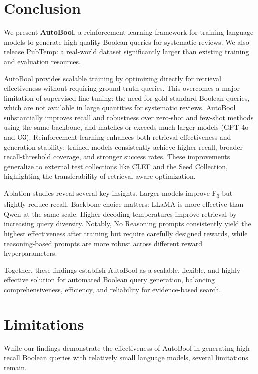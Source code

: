 \section{Conclusion}

We present \textbf{AutoBool}, a reinforcement learning framework for training language models to generate high-quality Boolean queries for systematic reviews. We also release PubTemp: a real-world dataset significantly larger than existing training and evaluation resources.

AutoBool provides scalable training by optimizing directly for retrieval effectiveness without requiring ground-truth queries. This overcomes a major limitation of supervised fine-tuning: the need for gold-standard Boolean queries, which are not available in large quantities for systematic reviews.
AutoBool substantially improves recall and robustness over zero-shot and few-shot methods using the same backbone, and matches or exceeds much larger models (GPT-4o and O3). Reinforcement learning enhances both retrieval effectiveness and generation stability: trained models consistently achieve higher recall, broader recall-threshold coverage, and stronger success rates. These improvements generalize to external test collections like CLEF and the Seed Collection, highlighting the transferability of retrieval-aware optimization.

Ablation studies reveal several key insights. Larger models improve F\textsubscript{3} but slightly reduce recall. Backbone choice matters: LLaMA is more effective than Qwen at the same scale. Higher decoding temperatures improve retrieval by increasing query diversity. Notably, No Reasoning prompts consistently yield the highest effectiveness after training but require carefully designed rewards, while reasoning-based prompts are more robust across different reward hyperparameters.

Together, these findings establish AutoBool as a scalable, flexible, and highly effective solution for automated Boolean query generation, balancing comprehensiveness, efficiency, and reliability for evidence-based search.



\section{Limitations}
While our findings demonstrate the effectiveness of AutoBool in generating high-recall Boolean queries with relatively small language models, several limitations remain.

